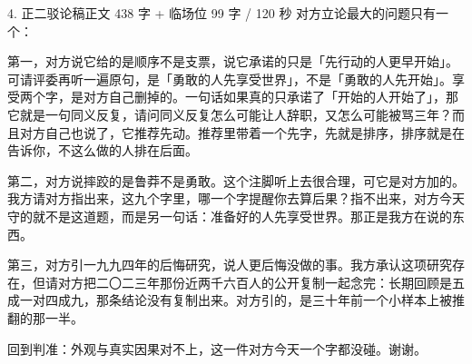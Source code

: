 \documentclass[script,pro]{debate}
\begin{document}
\begin{speech}{4. 正二驳论稿}{正文 438 字 + 临场位 99 字 / 120 秒}
对方立论最大的问题只有一个：

第一，对方说它给的是顺序不是支票，说它承诺的只是「先行动的人更早开始」。可请评委再听一遍原句，是「勇敢的人先享受世界」，不是「勇敢的人先开始」。享受两个字，是对方自己删掉的。一句话如果真的只承诺了「开始的人开始了」，那它就是一句同义反复，请问同义反复怎么可能让人辞职，又怎么可能被骂三年？而且对方自己也说了，它推荐先动。推荐里带着一个先字，先就是排序，排序就是在告诉你，不这么做的人排在后面。

第二，对方说摔跤的是鲁莽不是勇敢。这个注脚听上去很合理，可它是对方加的。我方请对方指出来，这九个字里，哪一个字提醒你去算后果？指不出来，对方今天守的就不是这道题，而是另一句话：准备好的人先享受世界。那正是我方在说的东西。

第三，对方引一九九四年的后悔研究，说人更后悔没做的事。我方承认这项研究存在，但请对方把二〇二三年那份近两千六百人的公开复制一起念完：长期回顾是五成一对四成九，那条结论没有复制出来。对方引的，是三十年前一个小样本上被推翻的那一半。


回到判准：外观与真实因果对不上，这一件对方今天一个字都没碰。谢谢。
\end{speech}
\begin{contingency}
\end{contingency}
\end{document}
